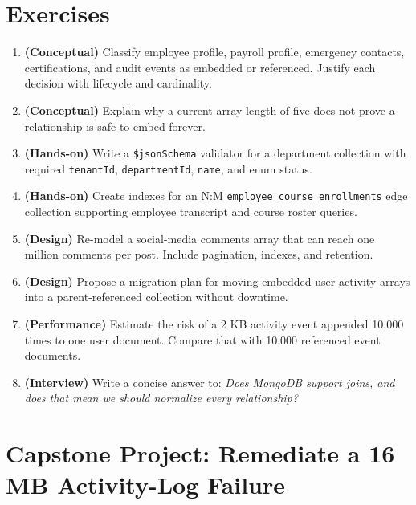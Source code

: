 \section{Exercises}
\begin{enumerate}
    \item \textbf{(Conceptual)} Classify employee profile, payroll profile, emergency contacts, certifications, and audit events as embedded or referenced. Justify each decision with lifecycle and cardinality.
    \item \textbf{(Conceptual)} Explain why a current array length of five does not prove a relationship is safe to embed forever.
    \item \textbf{(Hands-on)} Write a \texttt{\$jsonSchema} validator for a department collection with required \texttt{tenantId}, \texttt{departmentId}, \texttt{name}, and enum status.
    \item \textbf{(Hands-on)} Create indexes for an N:M \texttt{employee\_course\_enrollments} edge collection supporting employee transcript and course roster queries.
    \item \textbf{(Design)} Re-model a social-media comments array that can reach one million comments per post. Include pagination, indexes, and retention.
    \item \textbf{(Design)} Propose a migration plan for moving embedded user activity arrays into a parent-referenced collection without downtime.
    \item \textbf{(Performance)} Estimate the risk of a 2 KB activity event appended 10,000 times to one user document. Compare that with 10,000 referenced event documents.
    \item \textbf{(Interview)} Write a concise answer to: \emph{Does MongoDB support joins, and does that mean we should normalize every relationship?}
\end{enumerate}

\section{Capstone Project: Remediate a 16 MB Activity-Log Failure}\label{sec:ch3-capstone}

